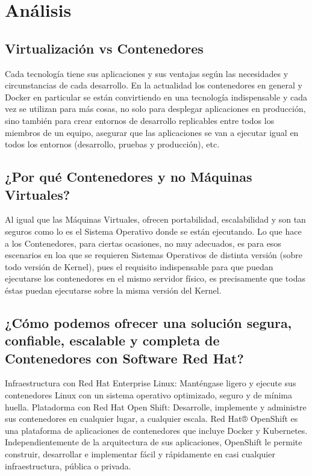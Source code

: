 \documentclass[preprint,12pt]{elsarticle}
\begin{document}



\section{Análisis}
\subsection{\textbf{Virtualización vs Contenedores}}

Cada tecnología tiene sus aplicaciones y sus ventajas según las necesidades y circunstancias de cada desarrollo. En la actualidad los contenedores en general y Docker en particular se están convirtiendo en una tecnología indispensable y cada vez se utilizan para más cosas, no solo para desplegar aplicaciones en producción, sino también para crear entornos de desarrollo replicables entre todos los miembros de un equipo, asegurar que las aplicaciones se van a ejecutar igual en todos los entornos (desarrollo, pruebas y producción), etc. 

\subsection{\textbf{¿Por qué Contenedores y no Máquinas Virtuales?}}
 Al igual que las Máquinas Virtuales, ofrecen portabilidad, escalabilidad y son tan seguros como lo es el Sistema Operativo donde se están ejecutando. Lo que hace a los Contenedores, para ciertas ocasiones, no muy adecuados, es para esos escenarios en loa que se requieren Sistemas Operativos de distinta versión (sobre todo versión de Kernel), pues el requisito indispensable para que puedan ejecutarse los contenedores en el mismo servidor físico, es precisamente que todas éstas puedan ejecutarse sobre la misma versión del Kernel.


\subsection{\textbf{¿Cómo podemos ofrecer una solución segura, confiable, escalable y completa de Contenedores con Software Red Hat?}}
Infraestructura con Red Hat Enterprise Linux: Manténgase ligero y ejecute sus contenedores Linux con un sistema operativo optimizado, seguro y de mínima huella. Platadorma con Red Hat Open Shift: Desarrolle, implemente y administre sus contenedores en cualquier lugar, a cualquier escala. Red Hat® OpenShift es una plataforma de aplicaciones de contenedores que incluye Docker y Kubernetes. Independientemente de la arquitectura de sus aplicaciones, OpenShift le permite construir, desarrollar e implementar fácil y rápidamente en casi cualquier infraestructura, pública o privada.
\end{document}
